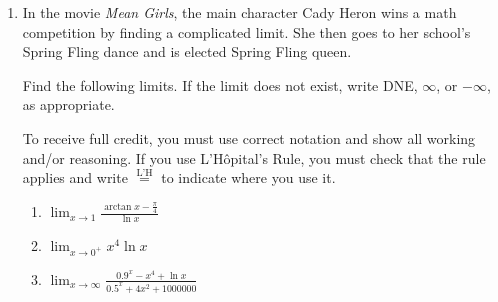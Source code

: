 \documentclass{article}
\begin{document}
\begin{enumerate}
\begin{enumerate}
\pspace{\newpage}

    \item 
    \begin{problem}
        Find all times between $t=0$ and $t=30$ when the stunt double is 35 feet above the ground. Fully simplify your answers and include units.
    \end{problem}

    \item 
    \begin{problem}
        Find all times between $t=0$ and $t=30$ when the stunt double is 10 feet above the ground. Give exact answers using inverse trigonometric functions and include units.
    \end{problem}
\end{enumerate}

\pspace{\newpage}

\item 
\begin{problem}
    In the movie \emph{Mean Girls}, the main character Cady Heron wins a math competition by finding a complicated limit. She then goes to her school's Spring Fling dance and is elected Spring Fling queen.
    
    Find the following limits. If the limit does not exist, write DNE, $\infty$, or $-\infty$, as appropriate.

         To receive full credit, you must use correct notation and show all working and/or reasoning. If you use L'Hôpital's Rule, you must check that the rule applies and write $\stackrel{\text{L'H}}{=}$ to indicate where you use it.
\end{problem}

    \begin{enumerate}
        \item 
        \begin{problem}
        $\displaystyle \lim_{x\to 1} \frac{\arctan{x}-\frac{\pi}{4}}{\ln x}$
        \end{problem}
        \pspace{\vfill}
        
        \item 
        \begin{problem}
        $\displaystyle \lim_{x\to0^+} x^{4} \ln{x}$
        \end{problem}
        \pspace{\vfill}

        \pspace{\newpage}
        
        \item 
        \begin{problem}
        $\displaystyle \lim_{x\to \infty} \frac{0.9^x -x^4 + \ln x}{0.5^x + 4x^2 + 1000000}$
        \end{problem}
        \pspace{\vfill}
        

\end{enumerate}
\end{enumerate}
\end{document}
